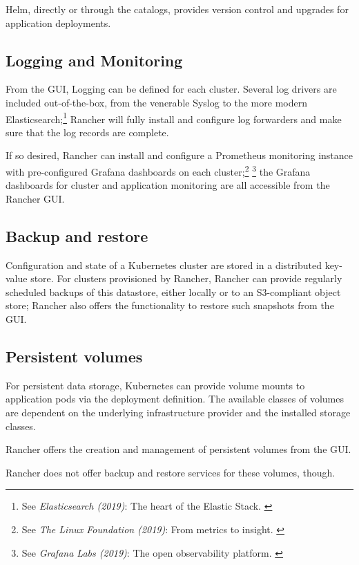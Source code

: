 Helm, directly or through the catalogs, provides version control and upgrades for application deployments.

\subsection{Logging and Monitoring}

From the GUI, Logging can be defined for each cluster. Several log drivers are included out-of-the-box, from the venerable Syslog to the more modern Elasticsearch;\footnote{See \textit{Elasticsearch (2019)}: The heart of the Elastic Stack. \cite{elastic}} Rancher will fully install and configure log forwarders and make sure that the log records are complete.

If so desired, Rancher can install and configure a Prometheus monitoring instance with pre-configured Grafana dashboards on each cluster;\footnote{See \textit{The Linux Foundation (2019)}: From metrics to insight. \cite{prometheus}} \footnote{See \textit{Grafana Labs (2019)}: The open observability platform. \cite{grafana}} the Grafana dashboards for cluster and application monitoring are all accessible from the Rancher GUI.

\subsection{Backup and restore}

Configuration and state of a Kubernetes cluster are stored in a distributed key-value store. For clusters provisioned by Rancher, Rancher can provide regularly scheduled backups of this datastore, either locally or to an S3-compliant object store; Rancher also offers the functionality to restore such snapshots from the GUI.

\subsection{Persistent volumes}

For persistent data storage, Kubernetes can provide volume mounts to application pods via the deployment definition. The available classes of volumes are dependent on the underlying infrastructure provider and the installed storage classes.

Rancher offers the creation and management of persistent volumes from the GUI.

Rancher does not offer backup and restore services for these volumes, though.

